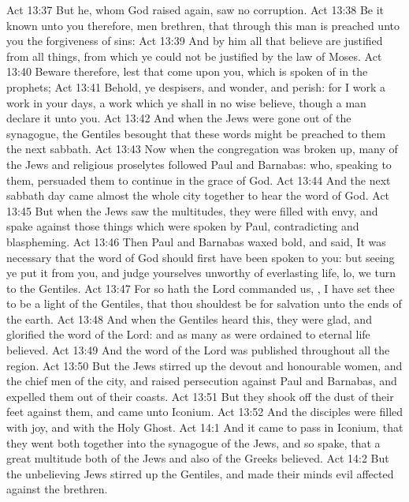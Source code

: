 \vs Act 13:37 But he, whom God raised again, saw no corruption.
\vs Act 13:38 Be it known unto you therefore, men  brethren, that through this man is preached unto you the forgiveness of sins:
\vs Act 13:39 And by him all that believe are justified from all things, from which ye could not be justified by the law of Moses.
\vs Act 13:40 Beware therefore, lest that come upon you, which is spoken of in the prophets;
\vs Act 13:41 Behold, ye despisers, and wonder, and perish: for I work a work in your days, a work which ye shall in no wise believe, though a man declare it unto you.
\vs Act 13:42 And when the Jews were gone out of the synagogue, the Gentiles besought that these words might be preached to them the next sabbath.
\vs Act 13:43 Now when the congregation was broken up, many of the Jews and religious proselytes followed Paul and Barnabas: who, speaking to them, persuaded them to continue in the grace of God.
\vs Act 13:44 And the next sabbath day came almost the whole city together to hear the word of God.
\vs Act 13:45 But when the Jews saw the multitudes, they were filled with envy, and spake against those things which were spoken by Paul, contradicting and blaspheming.
\vs Act 13:46 Then Paul and Barnabas waxed bold, and said, It was necessary that the word of God should first have been spoken to you: but seeing ye put it from you, and judge yourselves unworthy of everlasting life, lo, we turn to the Gentiles.
\vs Act 13:47 For so hath the Lord commanded us, , I have set thee to be a light of the Gentiles, that thou shouldest be for salvation unto the ends of the earth.
\vs Act 13:48 And when the Gentiles heard this, they were glad, and glorified the word of the Lord: and as many as were ordained to eternal life believed.
\vs Act 13:49 And the word of the Lord was published throughout all the region.
\vs Act 13:50 But the Jews stirred up the devout and honourable women, and the chief men of the city, and raised persecution against Paul and Barnabas, and expelled them out of their coasts.
\vs Act 13:51 But they shook off the dust of their feet against them, and came unto Iconium.
\vs Act 13:52 And the disciples were filled with joy, and with the Holy Ghost.
\vs Act 14:1 And it came to pass in Iconium, that they went both together into the synagogue of the Jews, and so spake, that a great multitude both of the Jews and also of the Greeks believed.
\vs Act 14:2 But the unbelieving Jews stirred up the Gentiles, and made their minds evil affected against the brethren.
